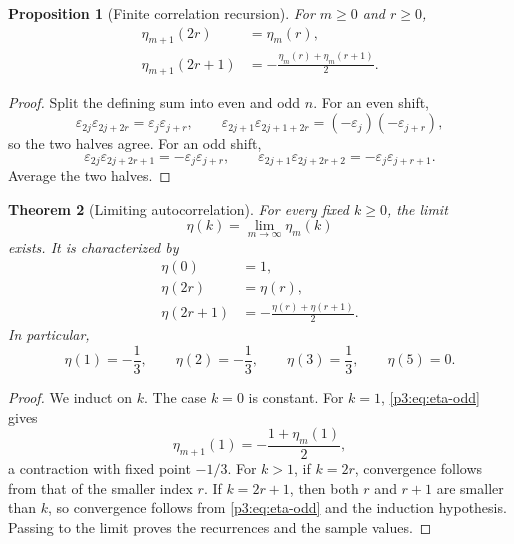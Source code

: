\documentclass[11pt,oneside]{article}
\newtheorem{theorem}{Theorem}[section]
\newtheorem{proposition}[theorem]{Proposition}
\theoremstyle{definition}
\theoremstyle{remark}
\newcommand{\eps}{\varepsilon}
\newcommand{\1}{\mathbf 1}
\begin{document}
\begin{proposition}[Finite correlation recursion]
\label{p3:prop:finite-correlation}
For \(m\ge0\) and \(r\ge0\),
\begin{align}
 \eta_{m+1}(2r)&=\eta_m(r),                                  \label{p3:eq:eta-even}\\
 \eta_{m+1}(2r+1)&=-\frac{\eta_m(r)+\eta_m(r+1)}2.           \label{p3:eq:eta-odd}
\end{align}
\end{proposition}

\begin{proof}
Split the defining sum into even and odd \(n\).  For an even shift,
\[
 \eps_{2j}\eps_{2j+2r}=\eps_j\eps_{j+r},
 \qquad
 \eps_{2j+1}\eps_{2j+1+2r}=(-\eps_j)(-\eps_{j+r}),
\]
so the two halves agree.  For an odd shift,
\[
 \eps_{2j}\eps_{2j+2r+1}=-\eps_j\eps_{j+r},
 \qquad
 \eps_{2j+1}\eps_{2j+2r+2}=-\eps_j\eps_{j+r+1}.
\]
Average the two halves.
\end{proof}

\begin{theorem}[Limiting autocorrelation]
\label{p3:thm:limiting-correlation}
For every fixed \(k\ge0\), the limit
\begin{equation}
 \eta(k)=\lim_{m\to\infty}\eta_m(k)
 \label{p3:eq:eta-limit}
\end{equation}
exists.  It is characterized by
\begin{align}
 \eta(0)&=1,                                                  \label{p3:eq:eta0}\\
 \eta(2r)&=\eta(r),                                           \label{p3:eq:eta-limit-even}\\
 \eta(2r+1)&=-\frac{\eta(r)+\eta(r+1)}2.                     \label{p3:eq:eta-limit-odd}
\end{align}
In particular,
\begin{equation}
 \eta(1)=-\frac13,
 \qquad
 \eta(2)=-\frac13,
 \qquad
 \eta(3)=\frac13,
 \qquad
 \eta(5)=0.
 \label{p3:eq:eta-examples}
\end{equation}
\end{theorem}

\begin{proof}
We induct on \(k\).  The case \(k=0\) is constant.  For \(k=1\),
\eqref{p3:eq:eta-odd} gives
\[
 \eta_{m+1}(1)=-\frac{1+\eta_m(1)}2,
\]
a contraction with fixed point \(-1/3\).  For \(k>1\), if \(k=2r\), convergence follows from
that of the smaller index \(r\).  If \(k=2r+1\), then both \(r\) and \(r+1\) are smaller than
\(k\), so convergence follows from \eqref{p3:eq:eta-odd} and the induction hypothesis.  Passing
to the limit proves the recurrences and the sample values.
\end{proof}
\end{document}
